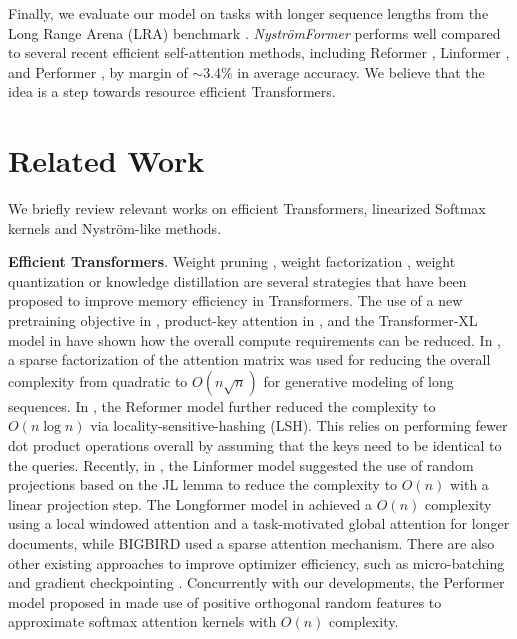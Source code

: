 Finally, we evaluate our model on tasks with longer sequence lengths from the Long Range Arena (LRA) benchmark \cite{tay2020long}. \textit{Nystr\"{o}mFormer} performs well compared to several recent efficient self-attention methods, including Reformer \cite{kitaev2019reformer}, Linformer \cite{wang2020linformer}, and Performer \cite{choromanski2020rethinking}, by margin of $\sim$3.4\% in average accuracy. We believe that the idea is a step towards resource efficient Transformers.

\section{Related Work}

We briefly review relevant works on efficient Transformers, linearized Softmax kernels and Nystr\"{o}m-like methods.

\medskip
\textbf{Efficient Transformers}. Weight pruning \cite{michel2019sixteen}, weight factorization \cite{lan2019albert}, weight quantization \cite{zafrir2019q8bert} or knowledge distillation \cite{sanh2019distilbert} are several strategies that have been proposed to improve memory efficiency in Transformers. The use of a new pretraining objective in \cite{clark2019electra},  product-key attention in \cite{lample2019large}, and the Transformer-XL model in  \cite{dai2019transformer} have shown how the overall compute requirements can be reduced. In \cite{child2019generating}, a sparse factorization of the attention matrix was used for reducing the overall complexity from quadratic to $O(n\sqrt{n})$ for generative modeling of long sequences. In \cite{kitaev2019reformer}, the Reformer model further reduced the complexity to $O(n\log n)$ via  locality-sensitive-hashing (LSH). This relies on performing fewer dot product operations overall by assuming that the keys need to be identical to the queries. Recently, in \cite{wang2020linformer}, the Linformer model suggested the use of random projections based on the JL lemma to reduce the complexity to $O(n)$ with a linear projection step. The Longformer model in \cite{Beltagy2020Longformer} achieved a $O(n)$ complexity using a local windowed attention and a task-motivated global attention for longer documents, while BIGBIRD \cite{zaheer2020big} used a sparse attention mechanism. There are also other existing approaches to improve optimizer efficiency, such as micro-batching \cite{huang2019gpipe} and gradient checkpointing \cite{chen2016training}. Concurrently with our developments, the Performer model proposed in \cite{choromanski2020rethinking} made use of positive orthogonal random features to approximate softmax attention kernels with $O(n)$ complexity. 

